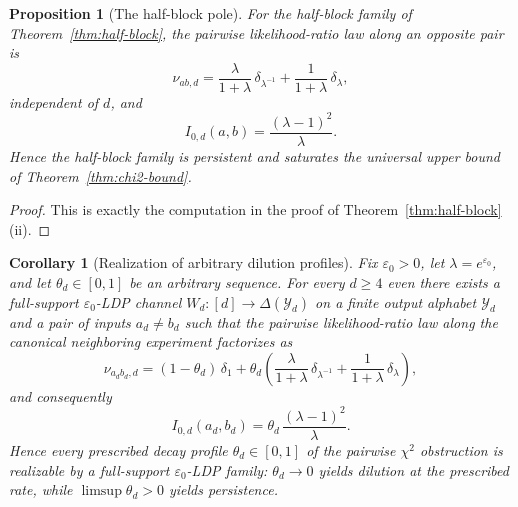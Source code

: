 \documentclass[11pt]{amsart}
\numberwithin{equation}{section}
\newtheorem{proposition}[theorem]{Proposition}
\newtheorem{corollary}[theorem]{Corollary}
\theoremstyle{definition}
\begin{document}
\begin{proposition}[The half-block pole]\label{prop:hb-pole}
For the half-block family of Theorem~\ref{thm:half-block}, the pairwise likelihood-ratio law along an
opposite pair is
\[
\nu_{ab,d}
=
\frac{\lambda}{1+\lambda}\,\delta_{\lambda^{-1}}
+
\frac{1}{1+\lambda}\,\delta_{\lambda}, \tag{7.4}\label{eq:hb-law}
\]
independent of $d$, and
\[
I_{0,d}(a,b)=\frac{(\lambda-1)^2}{\lambda}. \tag{7.5}\label{eq:hb-pole}
\]
Hence the half-block family is persistent and saturates the universal upper bound of
Theorem~\ref{thm:chi2-bound}.
\end{proposition}

\begin{proof}
This is exactly the computation in the proof of Theorem~\ref{thm:half-block}(ii).
\end{proof}

\begin{corollary}[Realization of arbitrary dilution profiles]\label{cor:interpolation}
Fix $\varepsilon_0>0$, let $\lambda=e^{\varepsilon_0}$, and let $\theta_d\in[0,1]$ be an arbitrary
sequence.  For every $d\ge 4$ even there exists a full-support $\varepsilon_0$-LDP channel
$W_d:[d]\to\Delta(\mathcal Y_d)$ on a finite output alphabet $\mathcal Y_d$ and a pair of inputs
$a_d\neq b_d$ such that the pairwise likelihood-ratio law along the canonical neighboring experiment
factorizes as
\[
\nu_{a_db_d,d}
=
(1-\theta_d)\,\delta_1
+
\theta_d\left(
\frac{\lambda}{1+\lambda}\,\delta_{\lambda^{-1}}
+
\frac{1}{1+\lambda}\,\delta_{\lambda}
\right),
\]
and consequently
\[
I_{0,d}(a_d,b_d)=\theta_d\,\frac{(\lambda-1)^2}{\lambda}. \tag{7.6}\label{eq:theta-interp}
\]
Hence every prescribed decay profile $\theta_d\in[0,1]$ of the pairwise $\chi^2$ obstruction is
realizable by a full-support $\varepsilon_0$-LDP family: $\theta_d\to 0$ yields dilution at the
prescribed rate, while $\limsup\theta_d>0$ yields persistence.
\end{corollary}
\end{document}
